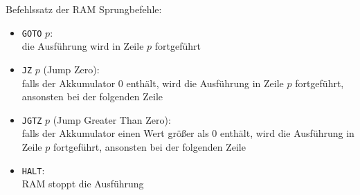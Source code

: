 \documentclass[german]{spicker}
\begin{document}
\begin{defi}{Befehlssatz der RAM}
  Sprungbefehle:
  \begin{itemize}
    \item \texttt{GOTO} $p$: \\
          die Ausführung wird in Zeile $p$ fortgeführt
    \item \texttt{JZ} $p$ (Jump Zero): \\
          falls der Akkumulator 0 enthält, wird die Ausführung in Zeile $p$ fortgeführt, ansonsten bei der folgenden Zeile
    \item \texttt{JGTZ} $p$ (Jump Greater Than Zero): \\
          falls der Akkumulator einen Wert größer als 0 enthält, wird die Ausführung in Zeile $p$ fortgeführt, ansonsten bei der folgenden Zeile
    \item \texttt{HALT}: \\
          RAM stoppt die Ausführung
  \end{itemize}
\end{defi}
\end{document}
